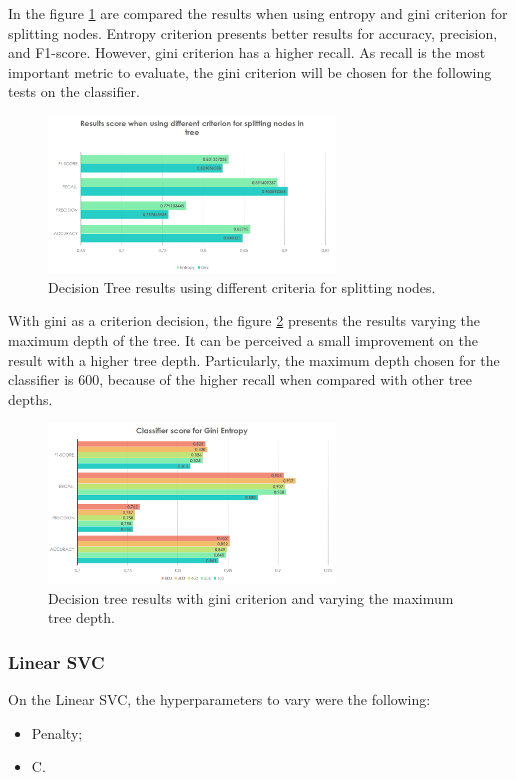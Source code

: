 \documentclass[journal]{IEEEtran}
\begin{document}
In the figure \ref{dtvaryingcriterion} are compared the results when using entropy and gini criterion for splitting nodes. Entropy criterion presents better results for accuracy, precision, and F1-score. However, gini criterion has a higher recall. As recall is the most important metric to evaluate, the gini criterion will be chosen for the following tests on the classifier.

\begin{figure}[!t]
\centering
\includegraphics[width=3in]{dt2_w}
\caption{Decision Tree results using different criteria for splitting nodes.}
\label{dtvaryingcriterion}
\end{figure}

With gini as a criterion decision, the figure \ref{dtfixedcriterion} presents the results varying the maximum depth of the tree. It can be perceived a small improvement on the result with a higher tree depth. Particularly, the maximum depth chosen for the classifier is 600, because of the higher recall when compared with other tree depths.

\begin{figure}[!t]
\centering
\includegraphics[width=3in]{dt3_w}
\caption{Decision tree results with gini criterion and varying the maximum tree depth.}
\label{dtfixedcriterion}
\end{figure}

\subsubsection{Linear SVC}
On the Linear SVC, the hyperparameters to vary were the following:
\begin{itemize}
\item Penalty;
\item C.
\end{itemize}
\end{document}
